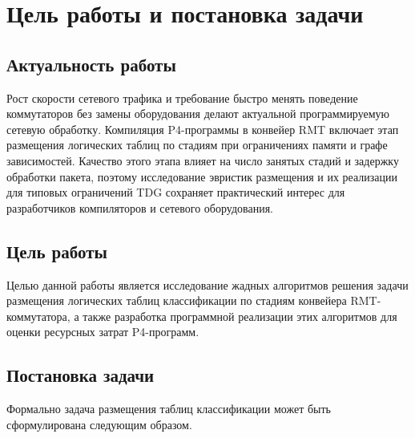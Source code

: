 \section{Цель работы и постановка задачи}
\label{sec:Chapter2} 

\subsection{Актуальность работы}
Рост скорости сетевого трафика и требование быстро менять поведение коммутаторов без замены оборудования делают актуальной программируемую сетевую обработку. Компиляция P4-программы в конвейер RMT включает этап размещения логических таблиц по стадиям при ограничениях памяти и графе зависимостей. Качество этого этапа влияет на число занятых стадий и задержку обработки пакета, поэтому исследование эвристик размещения и их реализации для типовых ограничений TDG сохраняет практический интерес для разработчиков компиляторов и сетевого оборудования.

\subsection{Цель работы}
Целью данной работы является исследование жадных алгоритмов решения задачи размещения логических таблиц классификации по стадиям конвейера RMT-коммутатора, а также разработка программной реализации этих алгоритмов для оценки ресурсных затрат P4-программ.

\subsection{Постановка задачи}
Формально задача размещения таблиц классификации  может быть сформулирована следующим образом.

